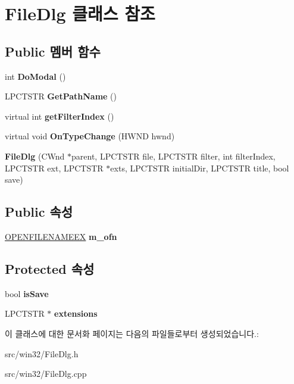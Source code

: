 \hypertarget{class_file_dlg}{}\section{File\+Dlg 클래스 참조}
\label{class_file_dlg}
\subsection*{Public 멤버 함수}
\begin{DoxyCompactItemize}
\item 
\mbox{\label{class_file_dlg_a45b5a0d6b2d8a9b973864ab2b36e16e0}} 
int {\bfseries Do\+Modal} ()
\item 
\mbox{\label{class_file_dlg_a52be84d9ca25a4d4dbb1f5e0ed1404bd}} 
L\+P\+C\+T\+S\+TR {\bfseries Get\+Path\+Name} ()
\item 
\mbox{\label{class_file_dlg_adee4c9560d3c2668654c50970f8e7f12}} 
virtual int {\bfseries get\+Filter\+Index} ()
\item 
\mbox{\label{class_file_dlg_a91dbefc4d06bedc4bd956838180dc3e8}} 
virtual void {\bfseries On\+Type\+Change} (H\+W\+ND hwnd)
\item 
\mbox{\label{class_file_dlg_a0a793ed11256c5a8d5d12d01e13e5eea}} 
{\bfseries File\+Dlg} (C\+Wnd $\ast$parent, L\+P\+C\+T\+S\+TR file, L\+P\+C\+T\+S\+TR filter, int filter\+Index, L\+P\+C\+T\+S\+TR ext, L\+P\+C\+T\+S\+TR $\ast$exts, L\+P\+C\+T\+S\+TR initial\+Dir, L\+P\+C\+T\+S\+TR title, bool save)
\end{DoxyCompactItemize}
\subsection*{Public 속성}
\begin{DoxyCompactItemize}
\item 
\mbox{\label{class_file_dlg_a3ee514d5dca456bd90c598af5412269a}} 
\mbox{\hyperlink{struct_o_p_e_n_f_i_l_e_n_a_m_e_e_x}{O\+P\+E\+N\+F\+I\+L\+E\+N\+A\+M\+E\+EX}} {\bfseries m\+\_\+ofn}
\end{DoxyCompactItemize}
\subsection*{Protected 속성}
\begin{DoxyCompactItemize}
\item 
\mbox{\label{class_file_dlg_aea50dcea1e8ef52d9b61f9cd37a69c0f}} 
bool {\bfseries is\+Save}
\item 
\mbox{\label{class_file_dlg_a5ee21f6dd33189d20e302e994323d578}} 
L\+P\+C\+T\+S\+TR $\ast$ {\bfseries extensions}
\end{DoxyCompactItemize}


이 클래스에 대한 문서화 페이지는 다음의 파일들로부터 생성되었습니다.\+:\begin{DoxyCompactItemize}
\item 
src/win32/File\+Dlg.\+h\item 
src/win32/File\+Dlg.\+cpp\end{DoxyCompactItemize}
